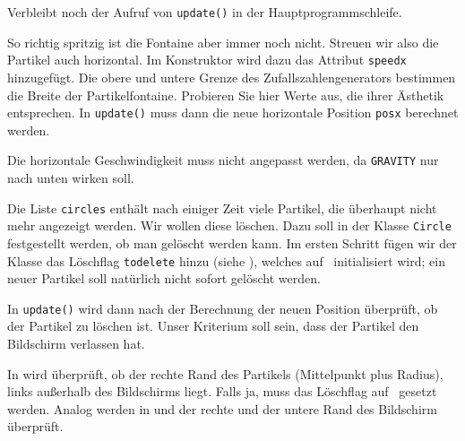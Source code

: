 
Verbleibt noch der Aufruf von \texttt{update()} in der Hauptprogrammschleife.


So richtig spritzig ist die Fontaine aber immer noch nicht. Streuen wir also die Partikel auch horizontal. Im Konstruktor wird dazu das Attribut \texttt{speedx} hinzugefügt. Die obere und untere Grenze des Zufallszahlengenerators bestimmen die Breite der Partikelfontaine. Probieren Sie hier Werte aus, die ihrer Ästhetik entsprechen. In \texttt{update()} muss dann die neue horizontale Position \texttt{posx} berechnet werden. 

Die horizontale Geschwindigkeit muss nicht angepasst werden, da \texttt{GRAVITY} nur nach unten wirken soll.


\begin{figure}%
	\begin{center}%
		\vspace{-1cm}%
	\end{center}%
\end{figure}%
Die Liste \texttt{circles} enthält nach einiger Zeit viele Partikel, die überhaupt nicht mehr angezeigt werden. Wir wollen diese löschen. Dazu soll in der Klasse \texttt{Circle} festgestellt werden, ob man gelöscht werden kann. Im ersten Schritt fügen wir der Klasse das Löschflag \texttt{todelete} hinzu (siehe ), welches auf \false\ initialisiert wird; ein neuer Partikel soll natürlich nicht sofort gelöscht werden.

In \texttt{update()} wird dann nach der Berechnung der neuen Position überprüft, ob der Partikel zu löschen ist. Unser Kriterium soll sein, dass der Partikel den Bildschirm verlassen hat.

In  wird überprüft, ob der rechte Rand des Partikels (Mittelpunkt plus Radius), links außerhalb des Bildschirms liegt. Falls ja, muss das Löschflag auf \true\ gesetzt werden. Analog werden in  und  der rechte und der untere Rand des Bildschirm überprüft. 

